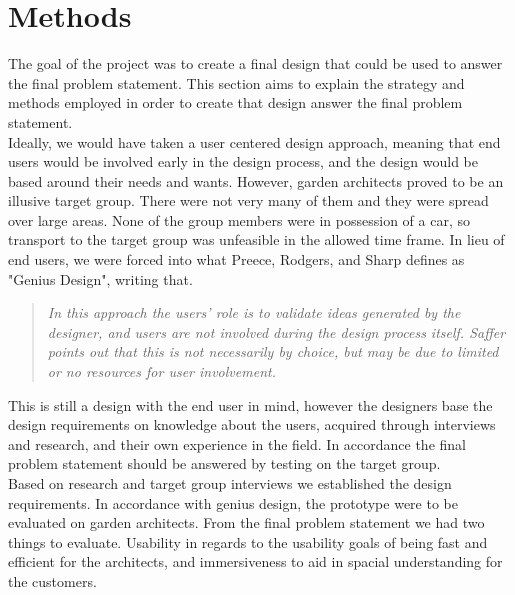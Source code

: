 \chapter{Methods}
The goal of the project was to create a final design that could be used to answer the final problem statement. This section aims to explain the strategy and methods employed in order to create that design answer the final problem statement.\\

Ideally, we would have taken a user centered design approach, meaning that end users would be involved early in the design process, and the design would be based around their needs and wants. However, garden architects proved to be an illusive target group. There were not very many of them and they were spread over large areas. None of the group members were in possession of a car, so transport to the target group was unfeasible in the allowed time frame. In lieu of end users, we were forced into what Preece, Rodgers, and Sharp defines as "Genius Design"\cite[p.~346]{interactionDesign}, writing that.\\
	\begin{quote}
	\textit{In this approach the users’ role is to validate ideas generated by the designer, and users are not involved during the design process itself. Saffer points out that this is not necessarily by choice, but may be due to limited or no resources for user involvement.}\\
	\end{quote}

This is still a design with the end user in mind, however the designers base the design requirements on knowledge about the users, acquired through interviews and research, and their own experience in the field. In accordance the final problem statement should be answered by testing on the target group.\\

Based on research and target group interviews we established the design requirements. In accordance with genius design, the prototype were to be evaluated on garden architects. From the final problem statement we had two things to evaluate. Usability in regards to the usability goals of being fast and efficient for the architects, and immersiveness to aid in spacial understanding for the customers.

